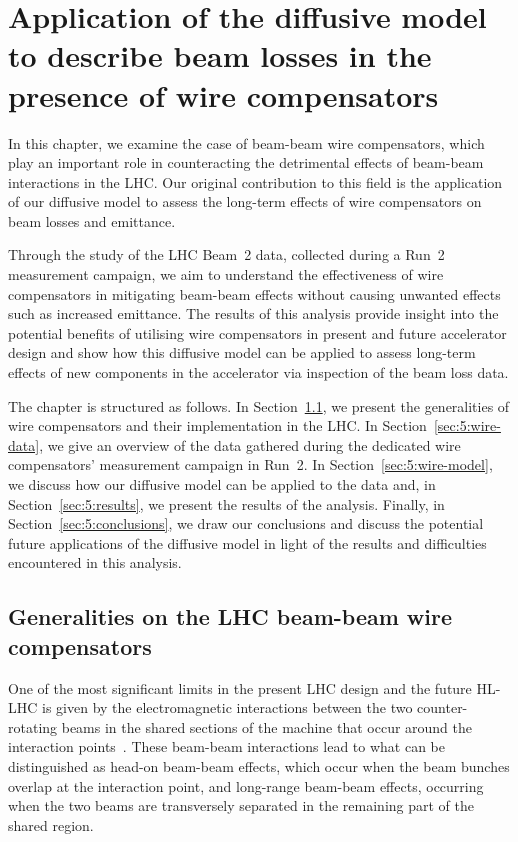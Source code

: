 \chapter{Application of the diffusive model to describe beam losses in the presence of wire compensators}\label{ch:wire-compensators}

In this chapter, we examine the case of beam-beam wire compensators, which play an important role in counteracting the detrimental effects of beam-beam interactions in the LHC. Our original contribution to this field is the application of our diffusive model to assess the long-term effects of wire compensators on beam losses and emittance.

Through the study of the LHC Beam~2 data, collected during a Run~2 measurement campaign, we aim to understand the effectiveness of wire compensators in mitigating beam-beam effects without causing unwanted effects such as increased emittance. The results of this analysis provide insight into the potential benefits of utilising wire compensators in present and future accelerator design and show how this diffusive model can be applied to assess long-term effects of new components in the accelerator via inspection of the beam loss data.

The chapter is structured as follows. In Section~\ref{sec:5:wire-compensators}, we present the generalities of wire compensators and their implementation in the LHC. In Section~\ref{sec:5:wire-data}, we give an overview of the data gathered during the dedicated wire compensators' measurement campaign in Run~2. In Section~\ref{sec:5:wire-model}, we discuss how our diffusive model can be applied to the data and, in Section~\ref{sec:5:results}, we present the results of the analysis. Finally, in Section~\ref{sec:5:conclusions}, we draw our conclusions and discuss the potential future applications of the diffusive model in light of the results and difficulties encountered in this analysis.

\section{Generalities on the LHC beam-beam wire compensators}\label{sec:5:wire-compensators}

One of the most significant limits in the present LHC design and the future HL-LHC is given by the electromagnetic interactions between the two counter-rotating beams in the shared sections of the machine that occur around the interaction points~\cite{Arduini_2016}. These beam-beam interactions lead to what can be distinguished as head-on beam-beam effects, which occur when the beam bunches overlap at the interaction point, and long-range beam-beam effects, occurring when the two beams are transversely separated in the remaining part of the shared region.

